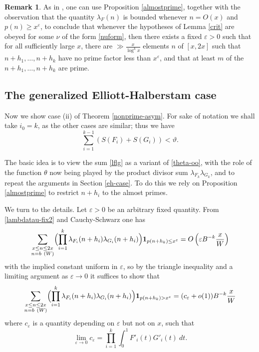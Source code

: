 \documentclass{bmcart}
\theoremstyle{plain}
\theoremstyle{definition}
\newtheorem{remark}[theorem]{Remark}
\newcommand\eps{\varepsilon}
\newcommand{\onef}{\mathbf{1}}
\begin{document}
\begin{remark} As in \cite{pintz-szemeredi}, one can use Proposition \ref{almostprime}, together with the observation that the quantity $\lambda_F(n)$ is bounded whenever $n = O(x)$ and $p(n) \geq x^\eps$, to conclude that whenever the hypotheses of Lemma \ref{crit} are obeyed for some $\nu$ of the form \eqref{nuform}, then there exists a fixed $\eps>0$ such that for all sufficiently large $x$, there are $\gg \frac{x}{\log^k x}$ elements $n$ of $[x,2x]$ such that $n+h_1,\dots,n+h_k$ have no prime factor less than $x^\eps$, and that at least $m$ of the $n+h_1,\dots,n+h_k$ are prime.
\end{remark}

\subsection{The generalized Elliott-Halberstam case}\label{geh-case}

Now we show case (ii) of Theorem \ref{nonprime-asym}.  For sake of notation we shall take $i_0=k$, as the other cases are similar; thus we have
\begin{equation}\label{ik1}
\sum_{i=1}^{k-1} (S(F_{i}) + S(G_{i})) < \vartheta.
\end{equation}

The basic idea is to view the sum \eqref{lflg} as a variant of \eqref{theta-oo}, with the role of the function $\theta$ now being played by the product divisor sum $\lambda_{F_k} \lambda_{G_k}$, and to repeat the arguments in Section \ref{eh-case}.  To do this we rely on Proposition \ref{almostprime} to restrict $n+h_i$ to the almost primes.

We turn to the details.  Let $\eps > 0$ be an arbitrary fixed quantity.  From \eqref{lambdatau-fix2} and Cauchy-Schwarz one has
$$
 \sum_{\substack{x \leq n \leq 2x\\ n = b\ (W)}} \Bigl(\prod_{i=1}^k \lambda_{F_{i}}(n+h_{i}) \lambda_{G_{i}}(n+h_{i})\Bigr) \onef_{p(n+h_k) \leq x^\eps} = O\left( \eps B^{-k} \frac{x}{W} \right)
$$
with the implied constant uniform in $\eps$,
so by the triangle inequality and a limiting argument as $\eps \to 0$ it suffices to show that
\begin{equation}\label{lltrunc}
 \sum_{\substack{x \leq n \leq 2x\\ n = b\ (W)}} \Bigl( \prod_{i=1}^k \lambda_{F_{i}}(n+h_{i}) \lambda_{G_{i}}(n+h_{i}) \Bigr)\onef_{p(n+h_k) > x^\eps} = (c_\eps + o(1)) B^{-k} \frac{x}{W} 
\end{equation}
where $c_\eps$ is a quantity depending on $\eps$ but not on $x$, such that
$$ \lim_{\eps \to 0} c_\eps = \prod_{i=1}^k \int_0^1 F'_i(t) G'_i(t)\ dt.$$
\end{document}
